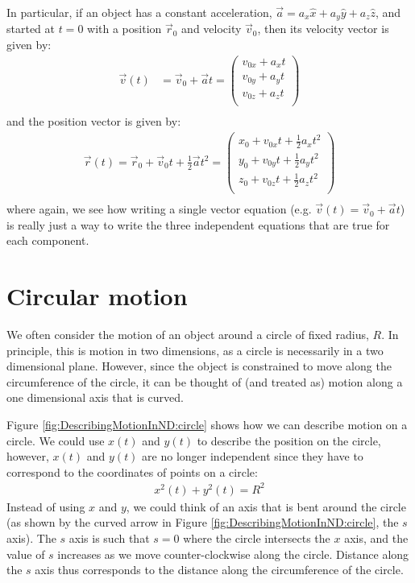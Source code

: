 In particular, if an object has a constant acceleration, $\vec a=a_x\hat x+a_y\hat y+a_z\hat z$, and started at $t=0$ with a position $\vec r_0$ and velocity $\vec v_0$, then its velocity vector is given by:
\begin{align*}
\vec v(t)  &= \vec v_0+\vec at=\begin{pmatrix}
           v_{0x}+ a_xt \\
           v_{0y}+ a_yt \\
           v_{0z}+ a_zt \\
         \end{pmatrix}\\
\end{align*}
and the position vector is given by:
\begin{align*}
\vec r(t)= \vec r_0+\vec v_0 t+\frac{1}{2}\vec a t^2=\begin{pmatrix}
           x_0+v_{0x}t+\frac{1}{2} a_xt^2 \\
           y_0+v_{0y}t+\frac{1}{2} a_yt^2 \\
           z_0+v_{0z}t+\frac{1}{2} a_zt^2 \\
         \end{pmatrix}\\
\end{align*}
where again, we see how writing a single vector equation (e.g. $\vec v(t) = \vec v_0+\vec at$) is really just a way to write the three independent equations that are true for each component.
\section{Circular motion}
We often consider the motion of an object around a circle of fixed radius, $R$. In principle, this is motion in two dimensions, as a circle is necessarily in a two dimensional plane. However, since the object is constrained to move along the circumference of the circle, it can be thought of (and treated as) motion along a one dimensional axis that is curved. 

Figure \ref{fig:DescribingMotionInND:circle} shows how we can describe motion on a circle. We could use $x(t)$ and $y(t)$ to describe the position on the circle, however, $x(t)$ and $y(t)$ are no longer independent since they have to correspond to the coordinates of points on a circle:
\begin{align*}
x^2(t)+y^2(t)=R^2
\end{align*}
Instead of using $x$ and $y$, we could think of an axis that is bent around the circle (as shown by the curved arrow in Figure \ref{fig:DescribingMotionInND:circle}, the $s$ axis). The $s$ axis is such that $s=0$ where the circle intersects the $x$ axis, and the value of $s$ increases as we move counter-clockwise along the circle. Distance along the $s$ axis thus corresponds to the distance along the circumference of the circle.


